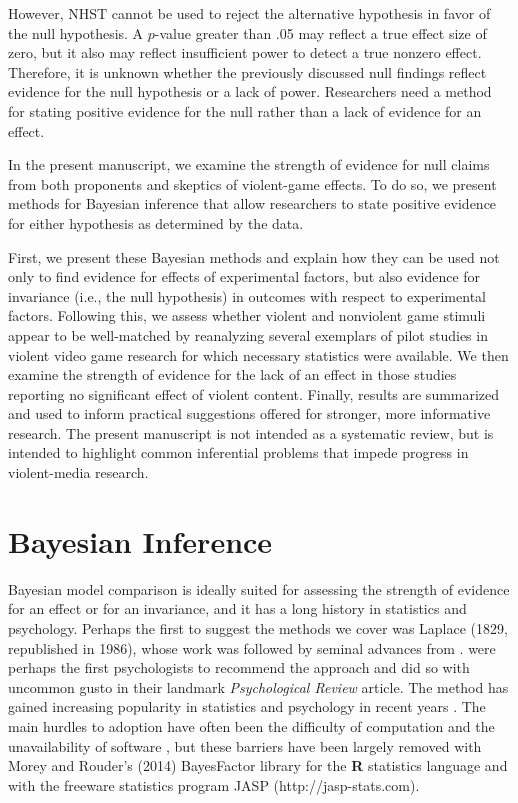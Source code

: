 \documentclass[man]{apa6}
\begin{document}
However, NHST cannot be used to  reject the alternative hypothesis in favor of the null hypothesis. A $p$-value greater than .05 may reflect a true effect size of zero, but it also may reflect insufficient power to detect a true nonzero effect. Therefore, it is unknown whether the previously discussed null findings reflect evidence for the null hypothesis or a lack of power.  Researchers need a method for stating positive evidence for the null rather than a lack of evidence for an effect.

In the present manuscript, we examine the strength of evidence for null claims from both proponents and skeptics of violent-game effects.  To do so, we present methods for Bayesian inference that allow researchers to state positive evidence for either hypothesis as determined by the data. 

First, we present these Bayesian methods and explain how they can be used not only to find evidence for effects of experimental factors, but also evidence for invariance (i.e., the null hypothesis) in outcomes with respect to experimental factors. Following this, we assess whether violent and nonviolent game stimuli appear to be well-matched by reanalyzing several exemplars of pilot studies in violent video game research for which necessary statistics were available.  We then examine the strength of evidence for the lack of an effect in those studies reporting no significant effect of violent content.  
Finally, results are summarized and used to inform practical suggestions offered for stronger, more informative research. 
The present manuscript is not intended as a systematic review, but is intended to highlight common inferential problems that impede progress in violent-media research.

\section{Bayesian Inference}
Bayesian model comparison is ideally suited for assessing the strength of evidence for an effect or for an invariance, and it has a long history in statistics and psychology.  Perhaps the first to suggest the methods we cover was Laplace (1829, republished in 1986), whose work was followed by seminal advances from \citet{Jeffreys:1961}.  \citet{Edwards:etal:1963} were perhaps the first psychologists to recommend the approach and did so with uncommon gusto in their landmark {\em Psychological Review} article.  The method has gained increasing popularity in statistics and psychology in recent years \citep{Berger:Delampady:1987,Gallistel:2009,Raftery:1995,Rouder:etal:2009a,Wagenmakers:2007}. The main hurdles to adoption have often been the difficulty of computation and the unavailability of software \citep{Gallistel:2009}, but these barriers have been largely removed with Morey and Rouder's (2014) BayesFactor library for the {\bf R} statistics language and with the freeware statistics program JASP (http://jasp-stats.com).
\end{document}
